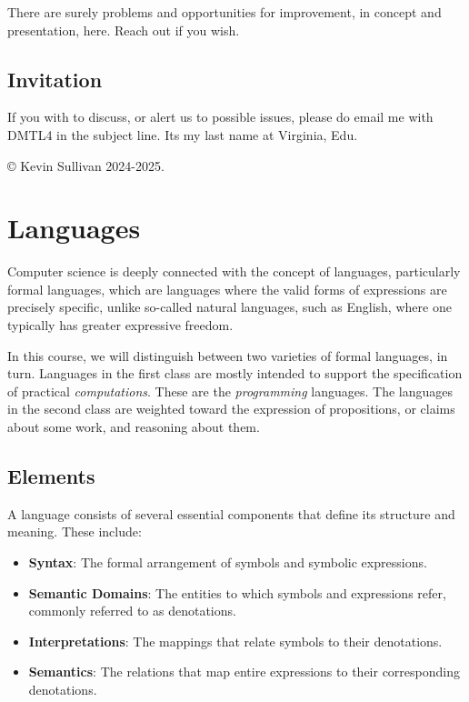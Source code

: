 \documentclass{book}
\providecommand{\tightlist}{%
  \setlength{\itemsep}{0pt}\setlength{\parskip}{0pt}}
\begin{document}
There are surely problems and opportunities for improvement, in concept and presentation, here. Reach out if you wish.

\hypertarget{pandoc.profile.debug__pandoc__debug__src__preface.md__invitation}{%
\section*{Invitation}\label{pandoc.profile.debug__pandoc__debug__src__preface.md__invitation}}

If you with to discuss, or alert us to possible issues, please do email me with DMTL4 in the subject line. It\textquotesingle s my last name at Virginia, Edu.

© Kevin Sullivan 2024-2025.

\hypertarget{pandoc.profile.debug__pandoc__debug__src__languages.md}{}
\hypertarget{pandoc.profile.debug__pandoc__debug__src__languages.md__languages}{%
\chapter{Languages}\label{pandoc.profile.debug__pandoc__debug__src__languages.md__languages}}

Computer science is deeply connected with the concept of languages,
particularly formal languages, which are languages where the valid
forms of expressions are precisely specific, unlike so-called natural
languages, such as English, where one typically has greater expressive
freedom.

In this course, we will distinguish between two varieties of formal
languages, in turn. Languages in the first class are mostly intended
to support the specification of practical \emph{computations}. These are
the \emph{programming} languages. The languages in the second class are
weighted toward the expression of propositions, or claims about some
work, and reasoning about them.

\hypertarget{pandoc.profile.debug__pandoc__debug__src__languages.md__elements}{%
\section*{Elements}\label{pandoc.profile.debug__pandoc__debug__src__languages.md__elements}}

A language consists of several essential components that define its structure and meaning. These include:

\begin{itemize}
\tightlist
\item
  \textbf{Syntax}: The formal arrangement of symbols and symbolic expressions.
\item
  \textbf{Semantic Domains}: The entities to which symbols and expressions refer, commonly referred to as denotations.
\item
  \textbf{Interpretations}: The mappings that relate symbols to their denotations.
\item
  \textbf{Semantics}: The relations that map entire expressions to their corresponding denotations.
\end{itemize}
\end{document}
